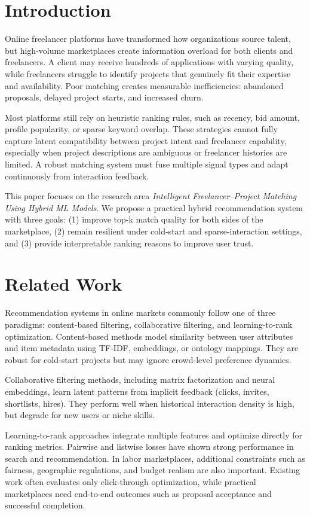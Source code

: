 \documentclass[conference]{IEEEtran}
\begin{document}
\section{Introduction}
Online freelancer platforms have transformed how organizations source talent, but high-volume marketplaces create information overload for both clients and freelancers. A client may receive hundreds of applications with varying quality, while freelancers struggle to identify projects that genuinely fit their expertise and availability. Poor matching creates measurable inefficiencies: abandoned proposals, delayed project starts, and increased churn.

Most platforms still rely on heuristic ranking rules, such as recency, bid amount, profile popularity, or sparse keyword overlap. These strategies cannot fully capture latent compatibility between project intent and freelancer capability, especially when project descriptions are ambiguous or freelancer histories are limited. A robust matching system must fuse multiple signal types and adapt continuously from interaction feedback.

This paper focuses on the research area \textit{Intelligent Freelancer--Project Matching Using Hybrid ML Models}. We propose a practical hybrid recommendation system with three goals: (1) improve top-k match quality for both sides of the marketplace, (2) remain resilient under cold-start and sparse-interaction settings, and (3) provide interpretable ranking reasons to improve user trust.

\section{Related Work}
Recommendation systems in online markets commonly follow one of three paradigms: content-based filtering, collaborative filtering, and learning-to-rank optimization. Content-based methods model similarity between user attributes and item metadata using TF-IDF, embeddings, or ontology mappings. They are robust for cold-start projects but may ignore crowd-level preference dynamics.

Collaborative filtering methods, including matrix factorization and neural embeddings, learn latent patterns from implicit feedback (clicks, invites, shortlists, hires). They perform well when historical interaction density is high, but degrade for new users or niche skills.

Learning-to-rank approaches integrate multiple features and optimize directly for ranking metrics. Pairwise and listwise losses have shown strong performance in search and recommendation. In labor marketplaces, additional constraints such as fairness, geographic regulations, and budget realism are also important. Existing work often evaluates only click-through optimization, while practical marketplaces need end-to-end outcomes such as proposal acceptance and successful completion.
\end{document}
